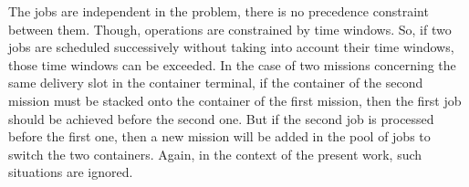 \documentclass[review]{elsarticle}
\begin{document}
The jobs are independent in the problem, there is no precedence constraint between them. Though, operations are constrained by time windows. So, if two jobs are scheduled successively without taking into account their time windows, those time windows can be exceeded. In the case of two missions concerning the same delivery slot in the container terminal, if the container of the second mission must be stacked onto the container of the first mission, then the first job should be achieved before the second one. But if the second job is processed before the first one, then a new mission will be added in the pool of jobs to switch the two containers. Again, in the context of the present work, such situations are ignored. %
\end{document}
